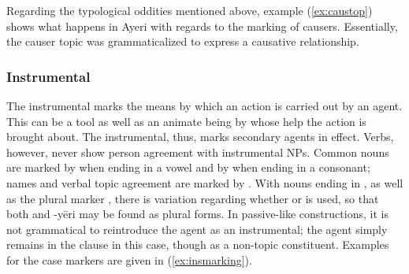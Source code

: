 Regarding the typological oddities mentioned above, example (\ref{ex:caustop}) 
shows what happens in Ayeri with regards to the marking of causers. 
Essentially, the causer topic was grammaticalized to express a causative 
relationship.


\subsubsection{Instrumental}
\label{subsubsec:instrumental}

The instrumental marks the means by which an action is carried out by an agent.
This can be a tool as well as an animate being by whose help the action is
brought about. The instrumental, thus, marks secondary agents in effect. Verbs,
however, never show person agreement with instrumental NPs. Common nouns are
marked by  when ending in a vowel and by 
when ending in a consonant; names and verbal topic agreement are marked by
. With nouns ending in , as well as the plural marker
, there is variation regarding whether  or 
 is used, so that both  and 
{-yēri} may be found as plural forms. In passive-like constructions, it is not
grammatical to reintroduce the agent as an instrumental; the agent simply
remains in the clause in this case, though as a non-topic constituent. Examples
for the case markers are given in (\ref{ex:insmarking}).

